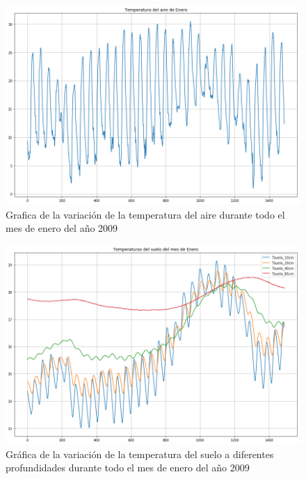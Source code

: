 \documentclass[12pt]{article}
\begin{document}
\begin{figure}
    \centering
    \includegraphics[scale = .4]{aireEnero.png}
    \caption{Grafica de la variaci\'on de la temperatura del aire durante todo el mes de enero del año 2009}
    \label{fig:aireEnero}
\end{figure}
\begin{figure}
    \centering
    \includegraphics[scale = .4]{sueloEnero.png}
    \caption{Gr\'afica de la variaci\'on de la temperatura del suelo a diferentes profundidades durante todo el mes de enero del año 2009}
    \label{fig:sueloEnero}
\end{figure}
\end{document}
